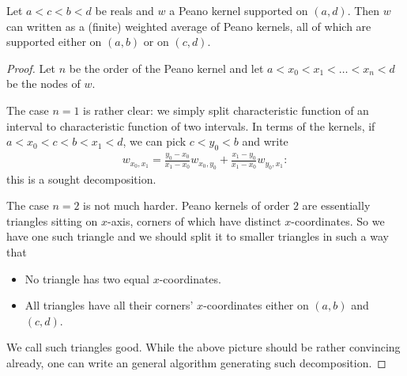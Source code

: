\begin{lem}\label{peano_splitting_theorem}
	Let $a < c < b < d$ be reals and $w$ a Peano kernel supported on $(a, d)$. Then $w$ can written as a (finite) weighted average of Peano kernels, all of which are supported either on $(a, b)$ or on $(c, d)$.
\end{lem}
\begin{proof}
	Let $n$ be the order of the Peano kernel and let $a < x_{0} < x_{1} < \ldots < x_{n} < d$ be the nodes of $w$.

	The case $n = 1$ is rather clear: we simply split characteristic function of an interval to characteristic function of two intervals. In terms of the kernels, if $a < x_{0} < c < b < x_{1} < d$, we can pick $c < y_{0} < b$ and write
	\begin{align*}
		w_{x_{0}, x_{1}} = \frac{y_{0} - x_{0}}{x_{1} - x_{0}} w_{x_{0}, y_{0}} + \frac{x_{1} - y_{0}}{x_{1} - x_{0}} w_{y_{0}, x_{1}}:
	\end{align*}
	this is a sought decomposition.

	The case $n = 2$ is not much harder. Peano kernels of order $2$ are essentially triangles sitting on $x$-axis, corners of which have distinct $x$-coordinates. So we have one such triangle and we should split it to smaller triangles in such a way that

	\begin{itemize}
		\item No triangle has two equal $x$-coordinates.
		\item All triangles have all their corners' $x$-coordinates either on $(a, b)$ and $(c, d)$.
	\end{itemize}
	We call such triangles good. While the above picture should be rather convincing already, one can write an general algorithm generating such decomposition.


\end{proof}

